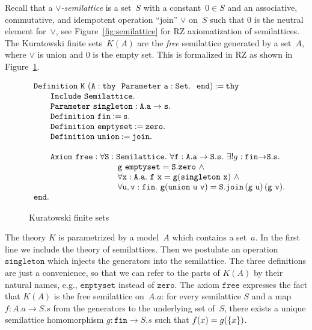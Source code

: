 Recall that a \emph{$\vee$-semilattice} is a set~$S$ with a
constant~$0 \in S$ and an associative, commutative, and idempotent
operation ``join'' $\vee$ on~$S$ such that $0$ is the neutral element
for~$\vee$, see Figure~\ref{fig:semilattice} for RZ axiomatization of
semilattices.
%
The Kuratowski finite sets~$K(A)$ are the \emph{free} semilattice
generated by a set~$A$, where $\vee$ is union and $0$ is the empty
set. This is formalized in RZ as shown in Figure~\ref{fig:kuratowski}.
%
\begin{figure}
\[
\begin{array}{l}
\iDefinition{\texttt{K}\ (\texttt{A} : \mathtt{thy}\ \  \iParameter{\mathtt{a}}{\iSet}.\ \  \texttt{end})}{\mathtt{thy}}\\
\qquad \iInclude{\mathtt{Semilattice}}.\\
\qquad \iParameter{\mathtt{singleton}}{\mathtt{A.a} \to \mathtt{s}}.\\
\qquad \iDefinition{\mathtt{fin}}{\mathtt{s}}.\\
\qquad \iDefinition{\mathtt{emptyset}}{\mathtt{zero}}.\\
\qquad \iDefinition{\mathtt{union}}{\mathtt{join}}.\\
\\
\qquad \iAxiom{\mathtt{free}}{} \forall \mathtt{S}:\mathtt{Semilattice}.\ \forall\mathtt{f}:{\mathtt{A.a}\to\mathtt{S.s}}.\ \exists!g:\mathtt{fin}{\to}{\mathtt{S.s}}.\\
\qquad \qquad \qquad \qquad \qquad \mathtt{g\ emptyset} = \mathtt{S.zero}\ \land\\
\qquad \qquad \qquad \qquad \qquad \forall\mathtt{x}:\mathtt{A.a}.\ \mathtt{f\ x} = \mathtt{g}(\mathtt{singleton\ x})\ \land\\
\qquad \qquad \qquad \qquad \qquad \forall\mathtt{u},\mathtt{v}:\mathtt{fin}.\ \mathtt{g}(\mathtt{union\ u\ v}) = \mathtt{S.join}\,(\mathtt{g\ u})\,(\mathtt{g\ v}).\\
\mathtt{end}.
\end{array}
\]
  \caption{Kuratowski finite sets}
  \label{fig:kuratowski}
\end{figure}
%
The theory $K$ is parametrized by a model~$A$ which contains a
set~$a$. In the first line we include the theory of semilattices. Then
we postulate an operation $\mathtt{singleton}$ which injects the
generators into the semilattice. The three definitions are just a
convenience, so that we can refer to the parts of $K(A)$ by their
natural names, e.g., $\mathtt{emptyset}$ instead of $\mathtt{zero}$.
The axiom $\mathtt{free}$ expresses the fact that $K(A)$ is the free
semilattice on~$A.a$: for every semilattice $S$ and a map $f : A.a \to
S.s$ from the generators to the underlying set of~$S$, there exists a
unique semilattice homomorphism $g : \mathtt{fin} \to S.s$ such that
$f(x) = g(\{x\})$.

